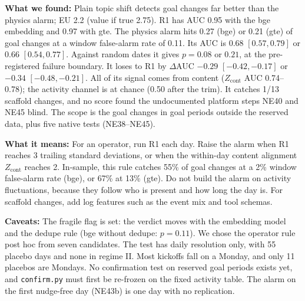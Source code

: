 \textbf{What we found:} Plain topic shift detects goal changes far better than the physics alarm\allowbreak{}; EU 2.2 (value if true 2.75). R1 has AUC 0.95 with the bge embedding and 0.97 with gte. The physics alarm hits 0.27 (bge) or 0.21 (gte) of goal changes at a window false-alarm rate of 0.11. Its AUC is 0.68 $[0.57, 0.79]$ or 0.66 $[0.54, 0.77]$. Against random dates it gives $p=0.08$ or $0.21$, at the pre-registered failure boundary. It loses to R1 by $\Delta$AUC $-0.29$ $[-0.42,-0.17]$ or $-0.34$ $[-0.48,-0.21]$. All of its signal comes from content ($Z_\mathrm{cont}$ AUC 0.74--0.78); the activity channel is at chance (0.50 after the trim). It catches 1/13 scaffold changes, and no score found the undocumented platform steps NE40 and NE45 blind. The scope is the goal changes in goal periods outside the reserved data, plus five native tests (NE38--NE45).

\textbf{What it means:} For an operator, run R1 each day. Raise the alarm when R1 reaches 3 trailing standard deviations, or when the within-day content alignment $Z_\mathrm{cont}$ reaches 2. In-sample, this rule catches 55\% of goal changes at a 2\% window false-alarm rate (bge), or 67\% at 13\% (gte). Do not build the alarm on activity fluctuations, because they follow who is present and how long the day is. For scaffold changes, add log features such as the event mix and tool schemas.

\textbf{Caveats:} The fragile flag is set: the verdict moves with the embedding model and the dedupe rule (bge without dedupe: $p=0.11$). We chose the operator rule post hoc from seven candidates. The test has daily resolution only, with 55 placebo days and none in regime II. Most kickoffs fall on a Monday, and only 11 placebos are Mondays. No confirmation test on reserved goal periods exists yet, and \texttt{confirm.py} must first be re-frozen on the fixed activity table. The alarm on the first nudge-free day (NE43b) is one day with no replication.
